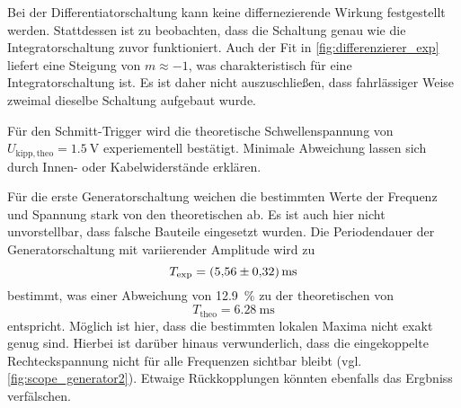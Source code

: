  Bei der Differentiatorschaltung kann keine differnezierende Wirkung festgestellt werden. Stattdessen ist zu beobachten, dass die Schaltung
 genau wie die Integratorschaltung zuvor funktioniert. Auch der Fit in \autoref{fig:differenzierer_exp} liefert eine Steigung von $m\approx -1$, 
 was charakteristisch für eine Integratorschaltung ist. Es ist daher nicht auszuschließen, dass fahrlässiger Weise zweimal dieselbe Schaltung
 aufgebaut wurde.

 Für den Schmitt-Trigger wird die theoretische Schwellenspannung von $U_{\mathrm{kipp, theo}} = \qty{1,5}{\volt}$ experiementell bestätigt.
 Minimale Abweichung lassen sich durch Innen- oder Kabelwiderstände erklären.

 Für die erste Generatorschaltung weichen die bestimmten Werte der Frequenz und Spannung stark von den theoretischen ab. Es ist auch hier 
 nicht unvorstellbar, dass falsche Bauteile eingesetzt wurden.
 Die Periodendauer der Generatorschaltung mit variierender Amplitude wird zu
\begin{equation*}
  T_{\mathrm{exp}} = \qty{5.56+-0.32}{\milli\second}
\end{equation*}
bestimmt, was einer Abweichung von \qty{12,9}{\percent} zu der theoretischen von
\begin{equation*}
    T_{\mathrm{theo}} = \qty{6,28}{\milli\second}
\end{equation*}
entspricht. Möglich ist hier, dass die bestimmten lokalen Maxima nicht exakt genug sind. Hierbei ist darüber hinaus verwunderlich, dass
die eingekoppelte Rechteckspannung nicht für alle Frequenzen sichtbar bleibt (vgl. \autoref{fig:scope_generator2}). Etwaige Rückkopplungen
könnten ebenfalls das Ergbniss verfälschen.

